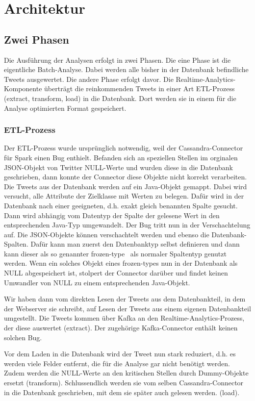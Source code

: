 \section{Architektur}
\subsection{Zwei Phasen}
Die Ausführung der Analysen erfolgt in zwei Phasen. Die eine Phase ist
die eigentliche Batch-Analyse. Dabei werden alle bisher in der
Datenbank befindliche Tweets ausgewertet. Die andere Phase erfolgt
davor. Die Realtime-Analytics-Komponente überträgt die reinkommenden
Tweets in einer Art ETL-Prozess (extract, transform, load) in die
Datenbank. Dort werden sie in einem für die Analyse optimierten Format
gespeichert.

\subsubsection{ETL-Prozess}
Der ETL-Prozess wurde ursprünglich notwendig, weil der
Cassandra-Connector für Spark einen Bug enthielt. Befanden sich an
speziellen Stellen im orginalen JSON-Objekt von Twitter NULL-Werte und
wurden diese in die Datenbank geschrieben, dann konnte der Connector
diese Objekte nicht korrekt verarbeiten. Die Tweets aus der Datenbank
werden auf ein Java-Objekt gemappt. Dabei wird versucht, alle Attribute
der Zielklasse mit Werten zu belegen. Dafür wird in der Datenbank nach
einer geeigneten, d.h. exakt gleich benannten Spalte gesucht. Dann wird
abhängig vom Datentyp der Spalte der gelesene Wert in den
entsprechenden Java-Typ umgewandelt. Der Bug tritt nun in der
Verschachtelung auf. Die JSON-Objekte können verschachtelt werden und
ebenso die Datenbank-Spalten. Dafür kann man zuerst den Datenbanktyp
selbst definieren und dann kann dieser als so genannter frozen-type
\ als normaler Spaltentyp genutzt werden. Wenn ein solches Objekt eines
frozen-types nun in der Datenbank als NULL abgespeichert ist, stolpert
der Connector darüber und findet keinen Umwandler von NULL zu einem
entsprechenden Java-Objekt.

Wir haben dann vom direkten Lesen der Tweets aus dem Datenbankteil, in
dem der Webserver sie schreibt, auf Lesen der Tweets aus einem eigenen
Datenbankteil umgestellt. Die Tweets kommen über Kafka an den
Realtime-Analytics-Prozess, der diese auswertet (extract). Der
zugehörige Kafka-Connector enthält keinen solchen Bug.

Vor dem Laden in die Datenbank wird der Tweet nun stark reduziert, d.h.
es werden viele Felder entfernt, die für die Analyse gar nicht benötigt
werden. Zudem werden die NULL-Werte an den kritischen Stellen durch
Dummy-Objekte ersetzt (transform). Schlussendlich werden sie vom selben
Cassandra-Connector in die Datenbank geschrieben, mit dem sie später
auch gelesen werden. (load).

